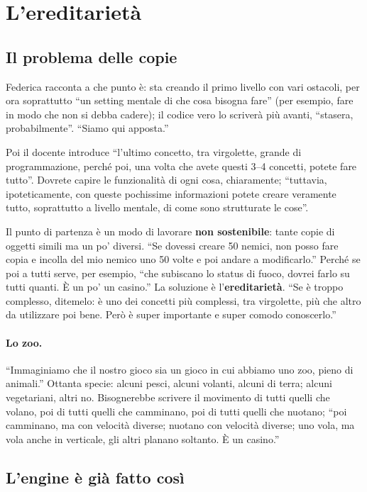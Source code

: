 \section{L'ereditarietà}
\label{gd13:sec:ereditarieta}

\subsection{Il problema delle copie}

Federica racconta a che punto è: sta creando il primo livello con vari
ostacoli, per ora soprattutto ``un setting mentale di che cosa bisogna fare''
(per esempio, fare in modo che non si debba cadere); il codice vero lo scriverà
più avanti, ``stasera, probabilmente''. ``Siamo qui apposta.''

Poi il docente introduce ``l'ultimo concetto, tra virgolette, grande di
programmazione, perché poi, una volta che avete questi 3--4 concetti, potete
fare tutto''. Dovrete capire le funzionalità di ogni cosa, chiaramente;
``tuttavia, ipoteticamente, con queste pochissime informazioni potete creare
veramente tutto, soprattutto a livello mentale, di come sono strutturate le
cose''.

Il punto di partenza è un modo di lavorare \textbf{non sostenibile}: tante copie
di oggetti simili ma un po' diversi. ``Se dovessi creare 50 nemici, non posso
fare copia e incolla del mio nemico uno 50 volte e poi andare a modificarlo.''
Perché se poi a tutti serve, per esempio, ``che subiscano lo status di fuoco,
dovrei farlo su tutti quanti. È un po' un casino.'' La soluzione è
l'\textbf{ereditarietà}. ``Se è troppo complesso, ditemelo: è uno dei concetti
più complessi, tra virgolette, più che altro da utilizzare poi bene. Però è super
importante e super comodo conoscerlo.''

\paragraph{Lo zoo.} ``Immaginiamo che il nostro gioco sia un gioco in cui
abbiamo uno zoo, pieno di animali.'' Ottanta specie: alcuni pesci, alcuni
volanti, alcuni di terra; alcuni vegetariani, altri no. Bisognerebbe scrivere il
movimento di tutti quelli che volano, poi di tutti quelli che camminano, poi di
tutti quelli che nuotano; ``poi camminano, ma con velocità diverse; nuotano con
velocità diverse; uno vola, ma vola anche in verticale, gli altri planano soltanto.
È un casino.''

\subsection{L'engine è già fatto così}

